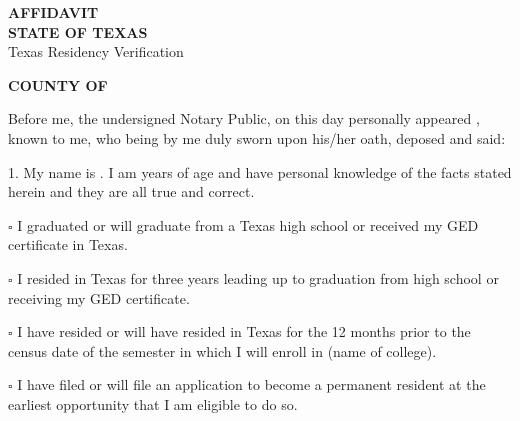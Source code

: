 \documentclass[12pt]{article}
\begin{document}
\begin{center}
    {\Large \textbf{AFFIDAVIT}}\\
    \textbf{STATE OF TEXAS}\\
    \small Texas Residency Verification
\end{center}

\vspace{1em}

\noindent \textbf{COUNTY OF} \underline{\hspace{5cm}}

\vspace{1em}

Before me, the undersigned Notary Public, on this day personally appeared
\underline{\hspace{7cm}}, known to me, who being by me duly sworn upon his/her oath, deposed and said:

\vspace{1em}

1. My name is \underline{\hspace{7cm}}. I am \underline{\hspace{2cm}} years of age and have personal knowledge of the facts stated herein and they are all true and correct.

\vspace{1em}

$\square$ I graduated or will graduate from a Texas high school or received my GED certificate in Texas.

\vspace{0.5em}
$\square$ I resided in Texas for three years leading up to graduation from high school or receiving my GED certificate.

\vspace{0.5em}
$\square$ I have resided or will have resided in Texas for the 12 months prior to the census date of the semester in which I will enroll in \underline{\hspace{7cm}} (name of college).

\vspace{0.5em}
$\square$ I have filed or will file an application to become a permanent resident at the earliest opportunity that I am eligible to do so.
\end{document}
